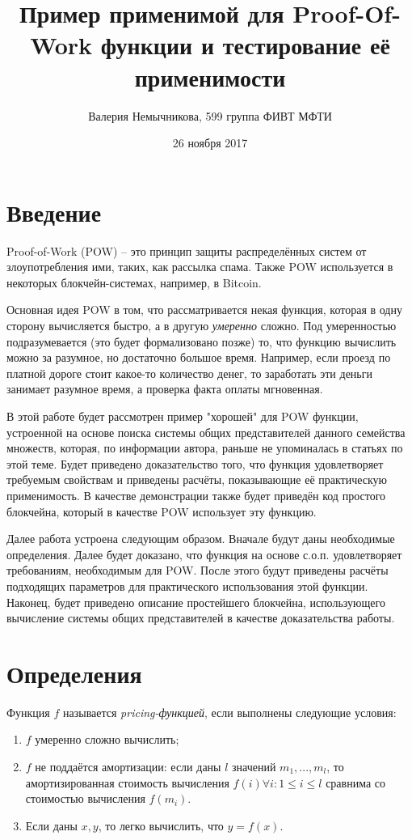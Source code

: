\documentclass{article}
\title{Пример применимой для Proof-Of-Work функции и тестирование её применимости}
\date{26 ноября 2017}
\author{Валерия Немычникова, 599 группа ФИВТ МФТИ}
\begin{document}
\maketitle


\section{Введение}

    Proof-of-Work (POW) -- это принцип защиты распределённых систем от злоупотребления ими, таких, как рассылка спама. Также POW используется в некоторых блокчейн-системах, например, в Bitcoin.

    Основная идея POW в том, что рассматривается некая функция, которая в одну сторону вычисляется быстро, а в другую \textit{умеренно} сложно. Под умеренностью подразумевается (это будет формализовано позже) то, что функцию вычислить можно за разумное, но достаточно большое время. Например, если проезд по платной дороге стоит какое-то количество денег, то заработать эти деньги занимает разумное время, а проверка факта оплаты мгновенная.

    В этой работе будет рассмотрен пример "хорошей" для POW функции, устроенной на основе поиска системы общих представителей данного семейства множеств, которая, по информации автора, раньше не упоминалась в статьях по этой теме. Будет приведено доказательство того, что функция удовлетворяет требуемым свойствам и приведены расчёты, показывающие её практическую применимость. В качестве демонстрации также будет приведён код простого блокчейна, который в качестве POW использует эту функцию.

    Далее работа устроена следующим образом. Вначале будут даны необходимые определения. Далее будет доказано, что функция на основе с.о.п. удовлетворяет требованиям, необходимым для POW. После этого будут приведены расчёты подходящих параметров для практического использования этой функции. Наконец, будет приведено описание простейшего блокчейна, использующего вычисление системы общих представителей в качестве доказательства работы.
\section{Определения}

Функция $f$ называется \textit{pricing-функцией}, если выполнены следующие условия:
\begin{enumerate}
\item $f$ умеренно сложно вычислить;
\item $f$ не поддаётся амортизации: если даны $l$ значений $m_1, ..., m_l$, то амортизированная стоимость вычисления $f(i) \forall i: 1 \leq i \leq l$ сравнима со стоимостью вычисления $f(m_i)$.
\item Если даны $x, y$, то легко вычислить, что $y = f(x)$.

\end{enumerate}
\end{document}
